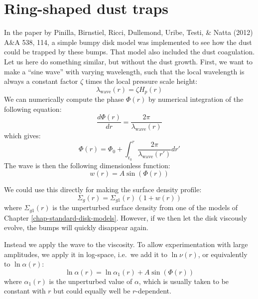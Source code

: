 \documentclass{book}
\begin{document}
\pagebreak
\section{Ring-shaped dust traps}
In the paper by Pinilla, Birnstiel, Ricci, Dullemond, Uribe, Testi, \& Natta
(2012) A\&A 538, 114, a simple bumpy disk model was implemented to see how
the dust could be trapped by these bumps. That model also included the
dust coagulation. Let us here do something similar, but without the dust
growth. First, we want to make a ``sine wave'' with varying wavelength,
such that the local wavelength is always a constant factor $\zeta$ times
the local pressure scale height:
\begin{equation}
\lambda_{\mathrm{wave}}(r) = \zeta H_p(r)
\end{equation}
We can numerically compute the phase $\Phi(r)$ by numerical integration of
the following equation:
\begin{equation}
\frac{d\Phi(r)}{dr} = \frac{2\pi}{\lambda_{\mathrm{wave}}(r)}
\end{equation}
which gives:
\begin{equation}
\Phi(r) = \Phi_0 + \int_{\mathrm{r_0}}^r \frac{2\pi}{\lambda_{\mathrm{wave}}(r')}dr'
\end{equation}
The wave is then the following dimensionless function:
\begin{equation}
w(r) = A \sin\left(\Phi(r)\right)
\end{equation}

We could use this directly for making the surface density profile:
\begin{equation}
\Sigma_g(r) = \Sigma_{g1}(r)\,(1+w(r))
\end{equation}
where $\Sigma_{g1}(r)$ is the unperturbed surface density from one of the
models of Chapter \ref{chap-standard-disk-models}. However, if we then let
the disk viscously evolve, the bumps will quickly disappear again.

Instead we apply the wave to the viscosity. To allow experimentation with large
amplitudes, we apply it in log-space, i.e.\ we add it to $\ln\nu(r)$, or
equivalently to $\ln\alpha(r)$:
\begin{equation}
\ln\alpha(r) = \ln\alpha_1(r) + A \sin\left(\Phi(r)\right)
\end{equation}
where $\alpha_1(r)$ is the unperturbed value of $\alpha$, which is usually
taken to be constant with $r$ but could equally well be $r$-dependent.
\end{document}
